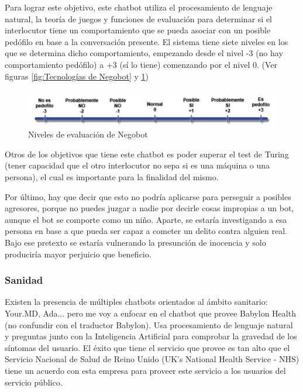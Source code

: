 \documentclass[spanish,12pt, a4paper, twoside]{paper}
\begin{document}
Para lograr este objetivo, este chatbot utiliza el procesamiento de lenguaje natural, la teoría de juegos y funciones de evaluación para determinar si el interlocutor tiene un comportamiento que se pueda asociar con un posible pedófilo en base a la conversación presente. El sistema tiene siete niveles en los que se determina dicho comportamiento, empezando desde el nivel -3 (no hay comportamiento pedófilo) a +3 (sí lo tiene) comenzando por el nivel 0. (Ver figuras \ref{fig:Tecnologías de Negobot} y \ref{fig:Niveles de evaluación de Negobot})
\newline

\begin{figure}[h]
\centering
	\includegraphics[width=\textwidth]{recursos/Negobot_puntuaciones}
\caption{Niveles de evaluación de Negobot}
\label{fig:Niveles de evaluación de Negobot}
\end{figure}

Otros de los objetivos que tiene este chatbot es poder superar el test de Turing (tener capacidad que el otro interlocutor no sepa si es una máquina o una persona), el cual es importante para la finalidad del mismo.
\newline

Por último, hay que decir que esto no podría aplicarse para perseguir a posibles agresores, porque no puedes juzgar a nadie por decirle cosas impropias a un bot, aunque el bot se comporte como un niño. Aparte, se estaría investigando a esa persona en base a que pueda ser capaz a cometer un delito contra alguien real. Bajo ese pretexto se estaría vulnerando la presunción de inocencia y solo produciría mayor perjuicio que beneficio.

\subsubsection{Sanidad}

Existen la presencia de múltiples chatbots orientados al ámbito sanitario: Your.MD, Ada... pero me voy a enfocar en el chatbot que provee Babylon Health (no confundir con el traductor Babylon). Usa procesamiento de lenguaje natural y preguntas junto con la Inteligencia Artificial para comprobar la gravedad de los síntomas del usuario. El éxito que tiene el servicio que provee es tan alto que el Servicio Nacional de Salud de Reino Unido (UK's National Health Service - NHS) tiene un acuerdo con esta empresa para proveer este servicio a los usuarios del servicio público.
\newline
\end{document}
